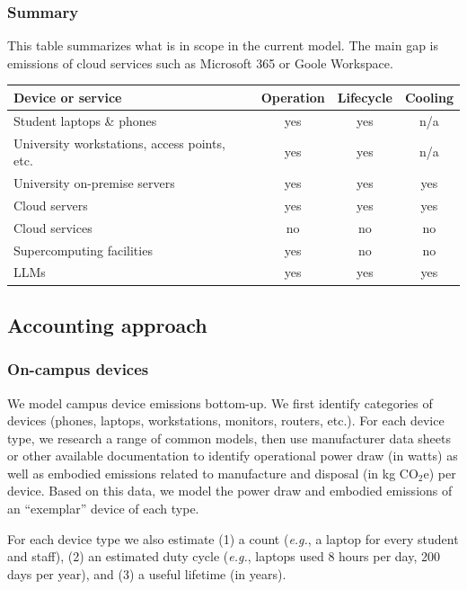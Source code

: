 \documentclass[11pt]{article}
\newcommand{\eg}{{\em e.g.}}
\newcommand{\coe}{CO$_2$e}
\newcommand{\gcoe}{g \coe}
\newcommand{\kgcoe}{k\gcoe}
\begin{document}
\subsubsection*{Summary}

This table summarizes what is in scope in the current model. The main gap is emissions of cloud services such as Microsoft 365 or Goole Workspace.

\begin{center}
  \begin{tabular}{|l|c|c|c|}
    \hline
    \textbf{Device or service} & \textbf{Operation} & \textbf{Lifecycle} & \textbf{Cooling} \\ \hline
    Student laptops \& phones & yes & yes & n/a \\
    University workstations, access points, etc. & yes & yes & n/a \\
    University on-premise servers & yes & yes & yes \\
    Cloud servers & yes & yes & yes \\
    Cloud services & no & no & no \\
    Supercomputing facilities & yes & no & no \\
    LLMs & yes & yes & yes \\ \hline
  \end{tabular}
  \label{tab:scopes}
\end{center}

\subsection{Accounting approach}

\subsubsection*{On-campus devices}

We model campus device emissions bottom-up. We first identify categories of devices (phones, laptops, workstations, monitors, routers, etc.). For each device type, we research a range of common models, then use manufacturer data sheets or other available documentation to identify operational power draw (in watts) as well as embodied emissions related to manufacture and disposal (in \kgcoe) per device. Based on this data, we model the power draw and embodied emissions of an ``exemplar'' device of each type.

For each device type we also estimate (1) a count (\eg, a laptop for every student and staff), (2) an estimated duty cycle (\eg, laptops used 8 hours per day, 200 days per year), and (3) a useful lifetime (in years).
\end{document}
